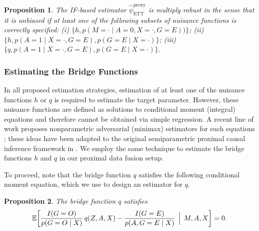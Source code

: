 \documentclass[10pt]{article}
\newtheorem{proposition}{Proposition}
\newcommand{\E}{\mathbb{E}}
\begin{document}
\begin{proposition}
\label{prop:DR:proximal_ett}	
The IF-based estimator $\hat\psi^{\text{proxy}}_{\text{ETT}}$ is multiply robust in the sense that it is unbiased if at least one of the following subsets of nuisance functions is correctly specified:
        (i) $\{h,p(M=\cdot\mid A=0,X=\cdot,G=E))\}$;
        (ii) $\{h,p(A=1\mid X=\cdot,G=E),p(G=E\mid X=\cdot)\}$;
        (iii) $\{q,p(A=1\mid X=\cdot,G=E),p(G=E\mid X=\cdot)\}$.
\end{proposition}



\subsubsection{Estimating the Bridge Functions}
\label{sec:est:bridge}
In all proposed estimation strategies, estimation of at least one of the nuisance functions \(h\) or \(q\) is required to estimate the target parameter. However, these nuisance functions are defined as solutions to conditional moment (integral) equations and therefore cannot be obtained via simple regression. A recent line of work proposes nonparametric adversarial (minimax) estimators for such equations \citep{dikkala2020minimax}; these ideas have been adapted to the original semiparametric proximal causal inference framework in \citep{ghassami2022minimax,kallus2021causal}. We employ the same technique to estimate the bridge functions \(h\) and \(q\) in our proximal data fusion setup.

To proceed, note that the bridge function \(q\) satisfies the following conditional moment equation, which we use to design an estimator for \(q\).

\begin{proposition}
\label{prop:qcondmomeq}
The bridge function \(q\) satisfies
{\small
\begin{equation}
\label{eq:IPWcondmomeqq}
\E\!\left[ \frac{I(G=O)}{p(G=O\mid X)}\,q(Z,A,X)
      - \frac{I(G=E)}{p(A,G=E\mid X)}
      \,\Bigm|\, M,A,X \right] = 0.
\end{equation}
}
\end{proposition}
\end{document}
